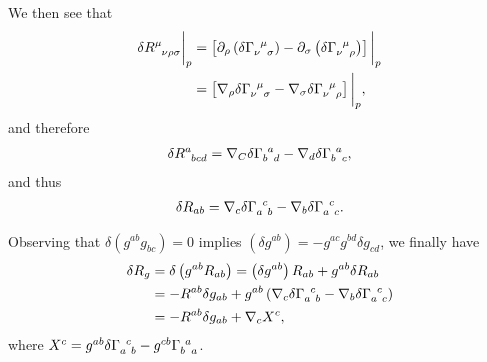 We then see that
\begin{align}
    \delta \tensor{R}{^{\mu}_{\nu \rho \sigma}} \bigg|_p &= \left[ \partial_\rho \left( \delta \tensor{\Gamma}{_\nu^{\mu}_\sigma} \right) - \partial_\sigma \left( \delta \tensor{\Gamma}{_{\nu}^{\mu}_\rho} \right)   \right] \bigg|_p \\
    &= \left[ \nabla_\rho \delta \tensor{\Gamma}{_\nu^{\mu}_\sigma} - \nabla_\sigma \delta \tensor{\Gamma}{_{\nu}^{\mu}_\rho}\right]  \bigg|_p
,\end{align}
and therefore
\begin{align}
    \delta \tensor{R}{^{a}_{bcd}} = \nabla_C \delta \tensor{\Gamma}{_b^{a}_d} - \nabla_d \delta \tensor{\Gamma}{_b^{a}_c}
,\end{align}
and thus
\begin{align}
    \delta R_{ab} = \nabla_c \delta \tensor{\Gamma}{_a^{c}_b} - \nabla_b \delta \tensor{\Gamma}{_a^{c}_c}
.\end{align}

Observing that $\delta \left( g^{ab} g_{bc} \right) = 0 $ implies $\left( \delta g^{ab} \right) = -g^{ac} g^{bd} \delta g_{cd}$, we finally have
\begin{align}
    \delta R_g &= \delta \left( g^{ab} R_{ab} \right) = \left( \delta g^{ab} \right) R_{ab} + g^{ab} \delta R_{ab} \\
    &= -R^{ab} \delta g_{ab} + g^{ab} \left( \nabla_c \delta \tensor{\Gamma}{_a^{c}_b} - \nabla_b \delta \tensor{\Gamma}{_a^{c}_c} \right)  \\
    &= -R^{ab} \delta g_{ab} + \nabla_c X^{c} 
,\end{align}
where $X^{c} = g^{ab} \delta \tensor{\Gamma}{_a^{c}_b} - g^{cb} \tensor{\Gamma}{_{b}^{a}_a}$.


